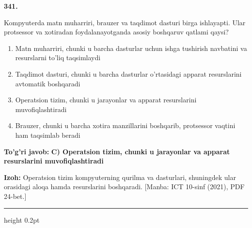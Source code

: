 \documentclass[10pt,a4paper]{article}
\begin{document}
{\bfseries\sffamily\color{ink} 341.}
\par
Kompyuterda matn muharriri, brauzer va taqdimot dasturi birga ishlayapti. Ular protsessor va xotiradan foydalanayotganda asosiy boshqaruv qatlami qaysi?
\begin{enumerate}[label=\Alph*),leftmargin=9mm]
\item Matn muharriri, chunki u barcha dasturlar uchun ishga tushirish navbatini va resurslarni to'liq taqsimlaydi
\item Taqdimot dasturi, chunki u barcha dasturlar o'rtasidagi apparat resurslarini avtomatik boshqaradi
\item Operatsion tizim, chunki u jarayonlar va apparat resurslarini muvofiqlashtiradi
\item Brauzer, chunki u barcha xotira manzillarini boshqarib, protsessor vaqtini ham taqsimlab beradi
\end{enumerate}
\begin{tcolorbox}[enhanced,breakable,colback=teal!4,colframe=teal!60!black,boxrule=0.45pt,arc=1.2mm,left=2.7mm,right=2.7mm,top=1.8mm,bottom=1.8mm,before skip=2mm,after skip=2mm]
{\bfseries\sffamily\color{teal}To'g'ri javob:} \textbf{C) Operatsion tizim, chunki u jarayonlar va apparat resurslarini muvofiqlashtiradi}
\par\smallskip
{\bfseries Izoh:} Operatsion tizim kompyuterning qurilma va dasturlari, shuningdek ular orasidagi aloqa hamda resurslarini boshqaradi. [Manba: ICT 10-sinf (2021), PDF 24-bet.]
\end{tcolorbox}
\vspace{2mm}\hrule height 0.2pt\vspace{3mm}
\end{document}
